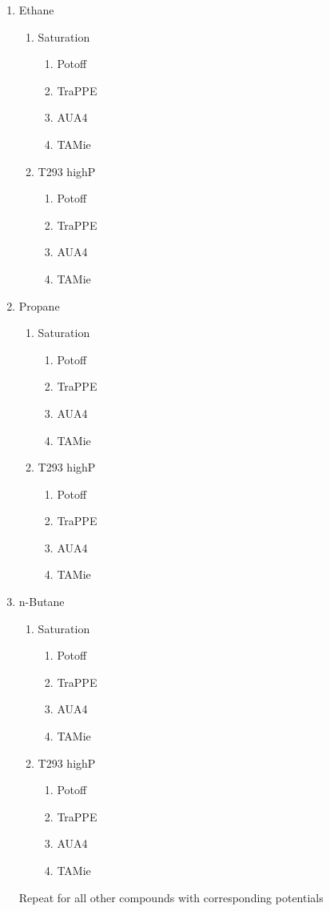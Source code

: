 \documentclass[preprint,review,12pt]{elsarticle}
\begin{document}
	\begin{enumerate}
		\item Ethane
		\begin{enumerate}
			\item Saturation
			\begin{enumerate}
				\item Potoff
				\item TraPPE
				\item AUA4
				\item TAMie
			\end{enumerate}
			\item T293 highP
			\begin{enumerate}
				\item Potoff
				\item TraPPE
				\item AUA4
				\item TAMie
			\end{enumerate}
		\end{enumerate}
		\item Propane
		\begin{enumerate}
			\item Saturation
			\begin{enumerate}
				\item Potoff
				\item TraPPE
				\item AUA4
				\item TAMie
			\end{enumerate}
			\item T293 highP
			\begin{enumerate}
				\item Potoff
				\item TraPPE
				\item AUA4
				\item TAMie
			\end{enumerate}
		\end{enumerate}
		\item n-Butane
		\begin{enumerate}
			\item Saturation
			\begin{enumerate}
				\item Potoff
				\item TraPPE
				\item AUA4
				\item TAMie
			\end{enumerate}
			\item T293 highP
			\begin{enumerate}
				\item Potoff
				\item TraPPE
				\item AUA4
				\item TAMie
			\end{enumerate}
		\end{enumerate}
		Repeat for all other compounds with corresponding potentials    
	\end{enumerate}
	
\end{document}
